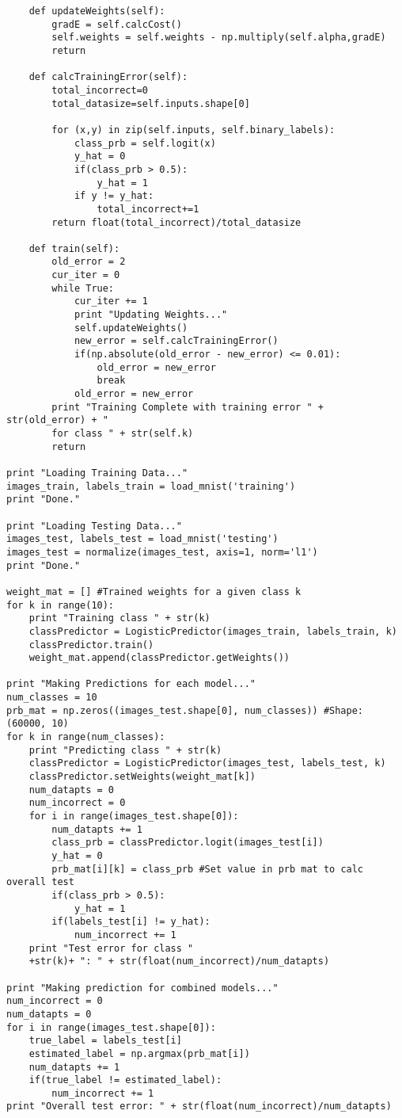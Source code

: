 \documentclass{article}
\begin{document}
\begin{spacing}{1.1}
\begin{lstlisting}
	def updateWeights(self):
		gradE = self.calcCost()
		self.weights = self.weights - np.multiply(self.alpha,gradE)
		return

	def calcTrainingError(self):
		total_incorrect=0
		total_datasize=self.inputs.shape[0]

		for (x,y) in zip(self.inputs, self.binary_labels):
			class_prb = self.logit(x)
			y_hat = 0
			if(class_prb > 0.5):
				y_hat = 1
			if y != y_hat:
				total_incorrect+=1
		return float(total_incorrect)/total_datasize

	def train(self):
		old_error = 2
		cur_iter = 0
		while True:
			cur_iter += 1
			print "Updating Weights..."
			self.updateWeights()
			new_error = self.calcTrainingError()
			if(np.absolute(old_error - new_error) <= 0.01):
				old_error = new_error
				break
			old_error = new_error
		print "Training Complete with training error " + str(old_error) + " 
		for class " + str(self.k) 
		return

print "Loading Training Data..."
images_train, labels_train = load_mnist('training')
print "Done."

print "Loading Testing Data..."
images_test, labels_test = load_mnist('testing')
images_test = normalize(images_test, axis=1, norm='l1')
print "Done."

weight_mat = [] #Trained weights for a given class k
for k in range(10):
	print "Training class " + str(k) 
	classPredictor = LogisticPredictor(images_train, labels_train, k)
	classPredictor.train()
	weight_mat.append(classPredictor.getWeights())

print "Making Predictions for each model..."
num_classes = 10
prb_mat = np.zeros((images_test.shape[0], num_classes)) #Shape: (60000, 10)
for k in range(num_classes):
	print "Predicting class " + str(k)
	classPredictor = LogisticPredictor(images_test, labels_test, k)
	classPredictor.setWeights(weight_mat[k])
	num_datapts = 0
	num_incorrect = 0
	for i in range(images_test.shape[0]):
		num_datapts += 1
		class_prb = classPredictor.logit(images_test[i])
		y_hat = 0
		prb_mat[i][k] = class_prb #Set value in prb mat to calc overall test
		if(class_prb > 0.5):
			y_hat = 1
		if(labels_test[i] != y_hat):
			num_incorrect += 1
	print "Test error for class "
	+str(k)+ ": " + str(float(num_incorrect)/num_datapts)

print "Making prediction for combined models..."
num_incorrect = 0
num_datapts = 0
for i in range(images_test.shape[0]):
	true_label = labels_test[i]
	estimated_label = np.argmax(prb_mat[i])
	num_datapts += 1
	if(true_label != estimated_label):
		num_incorrect += 1
print "Overall test error: " + str(float(num_incorrect)/num_datapts)
\end{lstlisting}
\newpage

\end{spacing}
\end{document}
